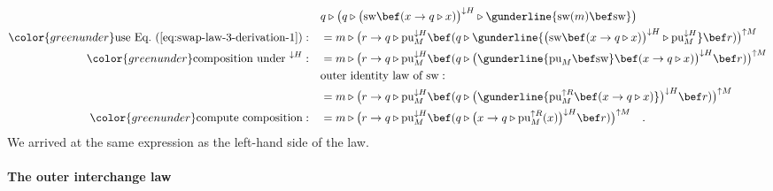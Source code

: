 \begin{align*}
 & q\triangleright\big(q\triangleright\big(\text{sw}\bef(x\rightarrow q\triangleright x)\big)^{\downarrow H}\triangleright\gunderline{\text{sw}(m)\bef\text{sw}}\big)\\
{\color{greenunder}\text{use Eq.~(\ref{eq:swap-law-3-derivation-1})}:}\quad & =m\triangleright\big(r\rightarrow q\triangleright\text{pu}_{M}^{\downarrow H}\bef(q\triangleright\gunderline{\big(\text{sw}\bef(x\rightarrow q\triangleright x)\big)^{\downarrow H}\triangleright\text{pu}_{M}^{\downarrow H}}\bef r)\big)^{\uparrow M}\\
{\color{greenunder}\text{composition under }^{\downarrow H}:}\quad & =m\triangleright\big(r\rightarrow q\triangleright\text{pu}_{M}^{\downarrow H}\bef(q\triangleright\big(\gunderline{\text{pu}_{M}\bef\text{sw}}\bef(x\rightarrow q\triangleright x)\big)^{\downarrow H}\bef r)\big)^{\uparrow M}\\
 & \text{outer identity law of }\text{sw}:\quad\\
 & =m\triangleright\big(r\rightarrow q\triangleright\text{pu}_{M}^{\downarrow H}\bef(q\triangleright\big(\gunderline{\text{pu}_{M}^{\uparrow R}\bef(x\rightarrow q\triangleright x)}\big)^{\downarrow H}\bef r)\big)^{\uparrow M}\\
{\color{greenunder}\text{compute composition}:}\quad & =m\triangleright\big(r\rightarrow q\triangleright\text{pu}_{M}^{\downarrow H}\bef(q\triangleright\big(x\rightarrow q\triangleright\text{pu}_{M}^{\uparrow R}(x)\big)^{\downarrow H}\bef r)\big)^{\uparrow M}\quad.
\end{align*}
We arrived at the same expression as the left-hand side of the law.

\paragraph{The outer interchange law}

